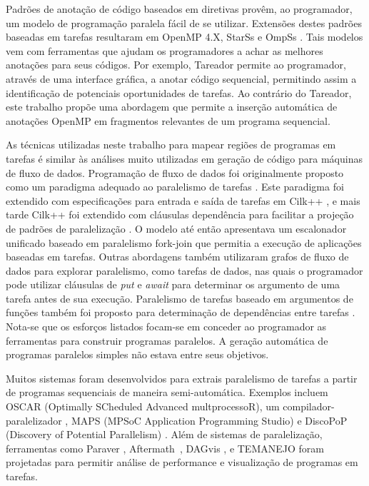 \documentclass[sigconf]{acmart}
\begin{document}
Padrões de anotação de código baseados em diretivas provêm, ao programador, um modelo de programação paralela fácil de se utilizar. Extensões destes padrões baseadas em tarefas resultaram em  OpenMP 4.X,
StarSs \cite{bellens:sc:2006, perez:iccc:2008, planas:hpca:2009,
tejedor:hpdc:2011} e OmpSs \cite{bueno:icpp:2011, duran:ppl:2011}. Tais modelos vem com ferramentas que ajudam os programadores a achar as melhores anotações para seus códigos. Por exemplo, Tareador \cite{Ayguade15} permite ao programador, através de uma interface gráfica, a anotar código sequencial, permitindo assim a identificação de potenciais oportunidades de tarefas. Ao contrário do Tareador, este trabalho propõe uma abordagem que permite a inserção automática de anotações OpenMP em fragmentos relevantes de um programa sequencial.

As técnicas utilizadas neste trabalho para mapear regiões de programas em tarefas é similar às análises muito utilizadas em geração de código para máquinas de fluxo de dados. Programação de fluxo de dados foi originalmente proposto como um paradigma adequado ao paralelismo de tarefas \cite{agrawal:ipdps:2010, chan:spaa:2007,
gupta:micro:2011}. Este paradigma foi extendido com especificações para entrada e saída de tarefas em Cilk++ \cite{agrawal:ipdps:2010}, e mais tarde Cilk++ foi extendido com cláusulas dependência para facilitar a projeção de padrões de paralelização \cite{vandierendonck:hotpar:2011}. O modelo até então apresentava um escalonador unificado baseado em paralelismo fork-join que permitia a execução de aplicações baseadas em tarefas. Outras abordagens também utilizaram grafos de fluxo de dados para explorar paralelismo, como tarefas de dados, nas quais o programador pode utilizar cláusulas de \textit{put} e \textit{await} para determinar os argumento de uma tarefa antes de sua execução. Paralelismo de tarefas baseado em argumentos de funções também foi proposto para determinação de dependências entre tarefas \cite{gupta:micro:2011}. Nota-se que os esforços listados focam-se em conceder ao programador as ferramentas para construir programas paralelos. A geração automática de programas paralelos simples não estava entre seus objetivos.

Muitos sistemas foram desenvolvidos para extrais paralelismo de tarefas a partir de programas sequenciais de maneira semi-automática. Exemplos incluem OSCAR (Optimally SCheduled Advanced multprocessoR), um compilador-paralelizador \cite{ishizaka:journal:2000}, MAPS (MPSoC Application Programming Studio) \cite{castrillon:tii:2013} e DiscoPoP (Discovery of Potential Parallelism) \cite{li:jss:2016}. Além de sistemas de paralelização, ferramentas como Paraver  \cite{paraver}, Aftermath~\cite{drebes:hipeac:2014}, DAGvis \cite{huynh:wvpa:2015}, e TEMANEJO
\cite{temanejo} foram projetadas para permitir análise de performance e visualização de programas em tarefas. 
\end{document}
